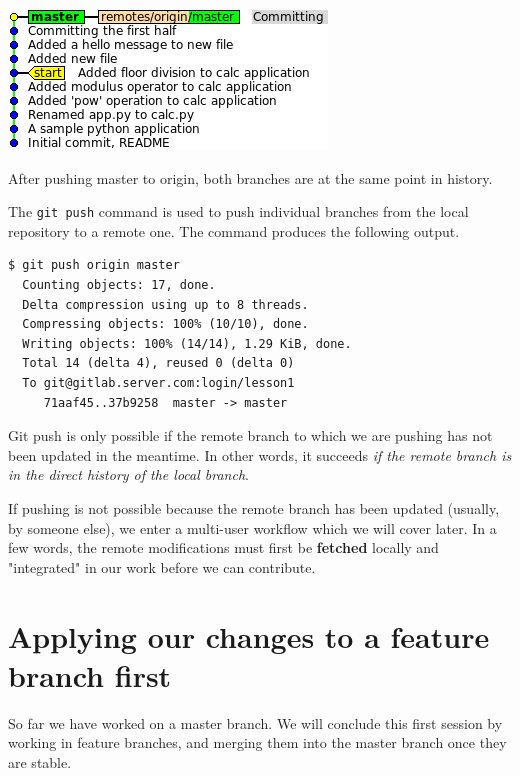 \documentclass{../common/tufte-latex/tufte-handout}
\begin{document}
\begin{marginfigure}%
  \centering
  \includegraphics[width=\linewidth]{gitcommit-post-push.png}
  \label{fig:gitcommit-post-push}
  \caption{After pushing master to origin, both branches are at the same point in history.}
\end{marginfigure}

The \texttt{git push} command is used to push individual branches from the local repository to a remote one.
The command produces the following output.

\begin{lstlisting}[style=BashInputStyle]
  $ git push origin master 
  Counting objects: 17, done.
  Delta compression using up to 8 threads.
  Compressing objects: 100% (10/10), done.
  Writing objects: 100% (14/14), 1.29 KiB, done.
  Total 14 (delta 4), reused 0 (delta 0)
  To git@gitlab.server.com:login/lesson1
     71aaf45..37b9258  master -> master
\end{lstlisting}

Git push is only possible if the remote branch to which we are pushing has not been updated in the meantime.
In other words, it succeeds \textit{if the remote branch is in the direct history of the local branch}.

If pushing is not possible because the remote branch has been updated (usually, by someone else), we enter a multi-user workflow which we will cover later.
In a few words, the remote modifications must first be \textbf{fetched} locally and "integrated" in our work before we can contribute.

\section{Applying our changes to a feature branch first}

So far we have worked on a master branch.
We will conclude this first session by working in feature branches, and merging them into the master branch once they are stable.
\end{document}
